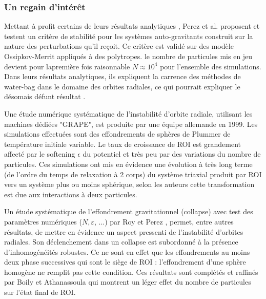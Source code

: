 \subsubsection{Un regain d'intérêt}


Mettant \`{a} profit certains de leurs r\'{e}sultats analytiques \cite{JPerez96}, 
Perez et al. \cite{perez_et_al} proposent et testent un crit\`{e}re de
stabilit\'{e} pour les syst\`{e}mes auto-gravitants construit sur la nature
des perturbations qu'il re\c{c}oit. Ce crit\`{e}re est valid\'{e} sur des
mod\`{e}le Ossipkov-Merrit appliqu\'{e}s \`{a} des polytropes. le nombre de
particules mis en jeu devient pour lapremi\`{e}re fois raisonnable
$N\approx10^{4}$ pour l'ensemble des simulations. Dans leurs résultats analytiques, ils expliquent la carrence des méthodes de water-bag dans le domaine des orbites radiales, ce qui pourrait expliquer le désomais défunt résultat \cite{waterbag}.

 Une \'{e}tude num\'{e}rique syst\'{e}matique de l'instabilit\'{e} d'orbite radiale, utilisant les machines d\'{e}di\'{e}es "GRAPE",  est produite par
une \'{e}quipe allemande \cite{theis} en 1999. Les simulations effectu\'{e}es sont
des effondrements de sph\`{e}res de Plummer de temp\'{e}rature initiale
variable. Le taux de croissance de ROI est grandement affect\'{e} par le
softening $\epsilon$ du potentiel et tr\`{e}s peu par des variations du nombre de
particules. Ces simulations ont mis en \'{e}vidence une \'{e}volution à
tr\`{e}s long terme (de l'ordre du temps de relaxation à 2 corps) du syst\`{e}me triaxial produit par ROI vers un
syst\`{e}me plus ou moins sph\'{e}rique, selon les auteurs cette transformation est due aux interactions à deux particules.

Un \'{e}tude syst\'{e}matique de l'effondrement gravitationnel (collapse) avec test des
param\`{e}tres num\'{e}riques ($N,\varepsilon$, ...) par Roy et Perez
\cite{roy}, permet, entre autres r\'{e}sultats, de mettre en \'{e}vidence un
aspect pressenti de l'instabilité d'orbites radiales. Son d\'{e}clenchement dans un collapse est
subordonn\'{e} \`{a} la pr\'{e}sence d'inhomog\'{e}n\'{e}it\'{e}s robustes.
Ce ne sont en effet que les effondrements au moins deux phase successives qui sont le si\`{e}ge
de ROI : l'effondrement d'une sphère homogène ne remplit pas cette condition. Ces r\'{e}sultats sont compl\'{e}t\'{e}s et raffin\'{e}s par Boily et
Athanassoula \cite{boily} qui montrent un l\'{e}ger effet du nombre de
particules sur l'\'{e}tat final de ROI.

